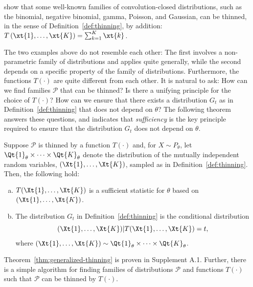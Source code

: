 \documentclass[12pt]{article}
\begin{document}
\begin{remark} \label{remark:convclosed}

 \cite{neufeld2023data} show that some well-known families of convolution-closed distributions, such as the binomial, negative binomial, gamma, Poisson, and Gaussian, can be thinned, in the sense of Definition~\ref{def:thinning}, by addition:  
$T\left(\xt{1}, \ldots, \xt{K}\right) = \sum_{k=1}^K \xt{k}$. 
\end{remark}

The two examples above do not resemble each other: The first involves a non-parametric family of distributions and applies quite generally, while the second depends on a  specific property of the family of distributions.  Furthermore, the functions $T(\cdot)$ are quite different from each other.  It is natural to ask: How can we find families $\mathcal P$ that can be thinned?  Is there a unifying principle for the choice of $T(\cdot)$? How can we ensure that there exists a distribution $G_t$ as in Definition~\ref{def:thinning} that does not depend on $\theta$?  The following theorem answers these questions, and indicates that \emph{sufficiency} is the key principle required to ensure that the distribution $G_t$ does not depend on $\theta$.



\begin{theorem} \label{thm:generalized-thinning}
Suppose $\mathcal P$ is thinned by a function $T(\cdot)$ and, for $X\sim P_\theta$, let $\Qt{1}_\theta\times\cdots\times\Qt{K}_\theta$ denote the distribution of the mutually independent random variables, $(\Xt{1},\ldots,\Xt{K})$, sampled as in Definition~\ref{def:thinning}. Then, the following hold:
\begin{enumerate}[(a)]
    \item $T(\Xt{1},\ldots,\Xt{K})$ is a sufficient statistic for $\theta$ based on $(\Xt{1},\ldots,\Xt{K})$.
    \item The distribution $G_t$  in Definition~\ref{def:thinning} is the conditional distribution
    $$
(\Xt{1},\ldots,\Xt{K})|T(\Xt{1},\ldots,\Xt{K})=t,
    $$
    where $(\Xt{1},\ldots,\Xt{K})\sim \Qt{1}_\theta\times\cdots\times\Qt{K}_\theta$.
    \end{enumerate}
\end{theorem}

Theorem~\ref{thm:generalized-thinning} is proven in Supplement A.1. Further, there is a simple algorithm for finding families of distributions $\mathcal{P}$ and functions $T(\cdot)$ such that $\mathcal P$ can be thinned by $T(\cdot)$.  
\end{document}
